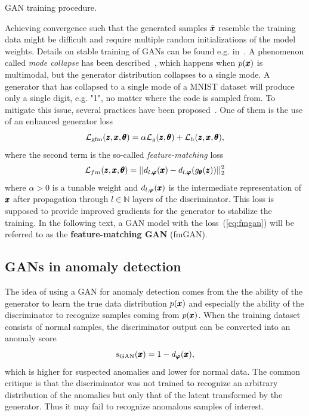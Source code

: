 \begin{algorithm}

\caption{GAN training procedure.}
\label{alg:gan_train}
\end{algorithm}

Achieving convergence such that the generated samples $\tilde{\pmb{{x}}}$ resemble the training data might be difficult and require multiple random initializations of the model weights. Details on stable training of GANs can be found e.g. in~\cite{gui2021review}. A phenomenon called \textit{mode collapse} has been described~\cite{goodfellow2016nips}, which happens when $p(\pmb{{x}})$ is multimodal, but the generator distribution collapses to a single mode. A generator that has collapsed to a single mode of a MNIST dataset will produce only a single digit, e.g. "1", no matter where the code is sampled from. To mitigate this issue, several practices have been proposed~\cite{salimans2016fmgan,hong2019generative}. One of them is the use of an enhanced generator loss
\begin{equation} \label{eq:fmgan}
\mathcal{L}_{\text{gfm}}(\pmb{{z}},\pmb{{x}},\pmb{{\theta}})=\alpha\mathcal{L}_{g}(\pmb{{z}},\pmb{{\theta}})+\mathcal{L}_{h}(\pmb{{z}},\pmb{{x}},\pmb{{\theta}}),
\end{equation}
where the second term is the so-called \textit{feature-matching} loss
\begin{equation} \label{eq:fm_loss}
\mathcal{L}_{fm}(\pmb{{z}},\pmb{{x}},\pmb{{\theta}}) = ||d_{l,\pmb{{\varphi}}}(\pmb{{x}})-d_{l,\pmb{{\varphi}}}(g_{\pmb{{\theta}}}(\pmb{{z}}))||_{2}^{2}
\end{equation}
where $\alpha > 0$ is a tunable weight and $d_{l,\pmb{{\varphi}}}(\pmb{{x}})$ is the intermediate representation of $\pmb{{x}}$ after propagation through $l \in \mathbb{N}$ layers of the discriminator. This loss is supposed to provide improved gradients for the generator to stabilize the training. In the following text, a GAN model with the loss~(\ref{eq:fmgan}) will be referred to as the \textbf{feature-matching GAN} (fmGAN).

\subsection{GANs in anomaly detection}
The idea of using a GAN for anomaly detection comes from the the ability of the generator to learn the true data distribution $p(\pmb{{x}})$ and especially the ability of the discriminator to recognize samples coming from $p(\pmb{{x}})$. When the training dataset consists of normal samples, the discriminator output can be converted into an anomaly score
\begin{equation} \label{eq:disc_score}
     s_{\text{GAN}}(\pmb{{x}}) = 1 - d_{\pmb{{\varphi}}}(\pmb{{x}}),
\end{equation}
which is higher for suspected anomalies and lower for normal data. The common critique is that the discriminator was not trained to recognize an arbitrary distribution of the anomalies but only that of the latent transformed by the generator. Thus it may fail to recognize anomalous samples of interest. 

